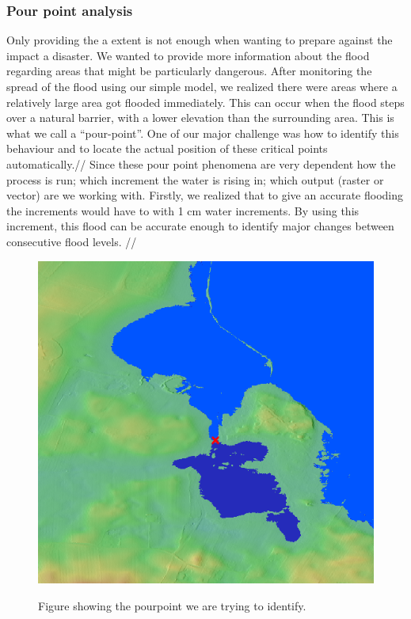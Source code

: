 \subsubsection{Pour point analysis}
Only providing the a extent is not enough when wanting to prepare against the impact a disaster. We wanted to provide more information about the flood regarding areas that might be particularly dangerous. After monitoring the  spread of the flood using our simple model, we realized there were areas where a relatively large area got flooded immediately. This can occur when the flood steps over a natural barrier, with a lower elevation than the surrounding area. This is what we call a “pour-point”. One of our major challenge was how to identify this behaviour and to locate the actual position of these critical points automatically.// 
Since these pour point phenomena are very dependent how the process is run; which increment the water is rising in; which output (raster or vector) are we working with. Firstly, we realized that to give an accurate flooding the increments would have to with 1 cm water increments. By using this increment, this flood can be accurate enough to identify major changes between consecutive flood levels. //

\begin{figure}[h!]
\centering
	{\includegraphics[width=.45\linewidth]{gfx/Pourpoint.png}}
\caption{Figure showing the pourpoint we are trying to identify.}
\end{figure}


